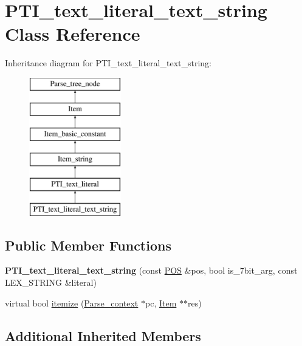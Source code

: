 \hypertarget{classPTI__text__literal__text__string}{}\section{P\+T\+I\+\_\+text\+\_\+literal\+\_\+text\+\_\+string Class Reference}
\label{classPTI__text__literal__text__string}
Inheritance diagram for P\+T\+I\+\_\+text\+\_\+literal\+\_\+text\+\_\+string\+:\begin{figure}[H]
\begin{center}
\leavevmode
\includegraphics[height=6.000000cm]{classPTI__text__literal__text__string}
\end{center}
\end{figure}
\subsection*{Public Member Functions}
\begin{DoxyCompactItemize}
\item 
\mbox{\label{classPTI__text__literal__text__string_aaa06caf7d99989667a26c96a72114c56}} 
{\bfseries P\+T\+I\+\_\+text\+\_\+literal\+\_\+text\+\_\+string} (const \mbox{\hyperlink{structYYLTYPE}{P\+OS}} \&pos, bool is\+\_\+7bit\+\_\+arg, const L\+E\+X\+\_\+\+S\+T\+R\+I\+NG \&literal)
\item 
virtual bool \mbox{\hyperlink{classPTI__text__literal__text__string_ac08dec875b8f03e717ca51e4e0c14682}{itemize}} (\mbox{\hyperlink{structParse__context}{Parse\+\_\+context}} $\ast$pc, \mbox{\hyperlink{classItem}{Item}} $\ast$$\ast$res)
\end{DoxyCompactItemize}
\subsection*{Additional Inherited Members}


